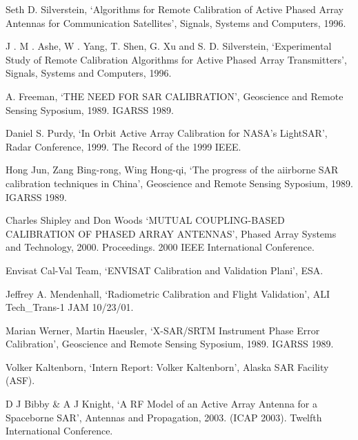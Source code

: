 \documentclass[a4paper,10pt]{article}
\begin{document}
\begin{enumerate}[ {[}1{]} ]
		\item \label{ppr:ext1} Seth D. Silverstein, \enquote*{Algorithms for 
		Remote Calibration of Active Phased Array Antennas for Communication 
		Satellites}, Signals, Systems and Computers, 1996.
		
		\item \label{ppr:ext2} J . M . Ashe, W . Yang, T. Shen, G. Xu and S. D.
		Silverstein, \enquote*{Experimental Study of Remote Calibration 
		Algorithms for Active Phased Array Transmitters}, Signals, Systems and
		Computers, 1996.
		
		\item A. Freeman, \enquote*{THE NEED FOR SAR CALIBRATION}, Geoscience
		and Remote Sensing Syposium, 1989. IGARSS 1989. 
		
		\item \label{ppr:ext3} Daniel S. Purdy, \enquote*{In Orbit Active Array
		Calibration for NASA’s LightSAR}, Radar Conference, 1999. The Record of
		the 1999 IEEE.
		
		\item \label{ppr:punc-ext1} Hong Jun, Zang Bing-rong, Wing Hong-qi, 
		\enquote*{The progress of the aiirborne SAR calibration techniques in 
		China}, Geoscience and Remote Sensing Syposium, 1989. IGARSS 1989.

		\item \label{ppr:mutual2} Charles Shipley and Don Woods \enquote*{MUTUAL
		COUPLING-BASED CALIBRATION OF PHASED ARRAY ANTENNAS}, Phased Array 
		Systems and Technology, 2000. Proceedings. 2000 IEEE International 
		Conference.
		
		\item Envisat Cal-Val Team, \enquote*{ENVISAT Calibration and Validation
		Plani}, ESA.
		
		\item \label{ppr:rad4} Jeffrey A. Mendenhall, \enquote*{Radiometric 
		Calibration and Flight Validation}, ALI Tech\_Trans-1 JAM 10/23/01.

		
		\item Marian Werner, Martin Haeusler, \enquote*{X-SAR/SRTM Instrument 
		Phase Error Calibration}, Geoscience and Remote Sensing Syposium, 1989.
		IGARSS 1989.
		
		\item \label{ppr:rad5} Volker Kaltenborn, \enquote*{Intern Report: 
		Volker Kaltenborn}, Alaska SAR Facility (ASF).
		
		\item \label{ppr:classic4} D J Bibby \& A J Knight, \enquote*{A RF Model
		of an Active Array Antenna for a Spaceborne SAR}, Antennas and 
		Propagation, 2003. (ICAP 2003). Twelfth International Conference.
		

\end{enumerate}
\end{document}
